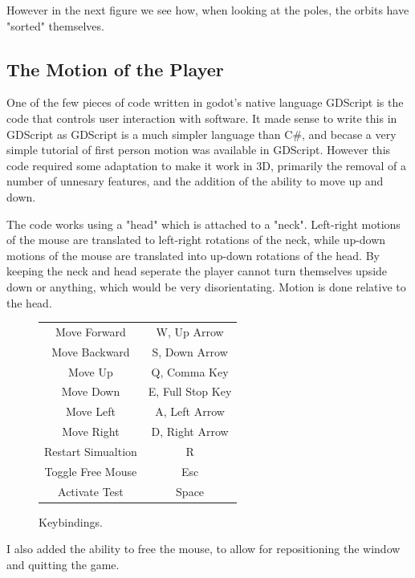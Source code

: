 \documentclass[12pt]{article}
\begin{document}
However in the next figure we see how, when looking at the poles, the orbits have "sorted" themselves.


\subsection{The Motion of the Player}

One of the few pieces of code written in godot's native language GDScript is the code that controls user interaction with software. It made sense to write this in GDScript as GDScript is a much simpler language than C\#, and becase a very simple tutorial of first person motion was available in GDScript\cite{FirstPersonMotion}. However this code required some adaptation to make it work in 3D, primarily the removal of a number of unnesary features, and the addition of the ability to move up and down.

The code works using a "head" which is attached to a "neck". Left-right motions of the mouse are translated to left-right rotations of the neck, while up-down motions of the mouse are translated into up-down rotations of the head. By keeping the neck and head seperate the player cannot turn themselves upside down or anything, which would be very disorientating. Motion is done relative to the head.

\begin{figure}
\begin{center}
\label{fig:Keybindings}
\caption{Keybindings.}
\begin{tabular}{ | c | c  | }
	\hline
	Move Forward & W, Up Arrow \\
	Move Backward & S, Down Arrow\\
	Move Up & Q, Comma Key\\
	Move Down & E, Full Stop Key\\
	Move Left & A, Left Arrow \\
	Move Right & D, Right Arrow \\
	Restart Simualtion & R \\
	Toggle Free Mouse & Esc \\
	Activate Test & Space \\
	\hline
\end{tabular}
\end{center}
\end{figure}

I also added the ability to free the mouse, to allow for repositioning the window and quitting the game.
\end{document}
